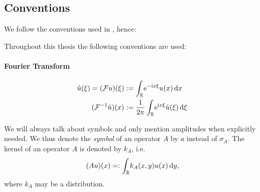 \subsection{Conventions}
We follow the conventions used in \cite{Les:PDO}, hence:

Throughout this thesis the following conventions are used:
\paragraph{Fourier Transform}
\begin{align*}
  \hat{u}(\xi) = (\mathcal{F}u)(\xi)
    &:= \Integ{\mathbb{R}}{x}{\Eto{-\mathrm ix\xi} u(x)} \\
  (\mathcal{F}^{-1}\hat{u})(x) &:=
  \frac{1}{2\pi}\Integ{\mathbb{R}}{\xi}{\Eto{\mathrm ix\xi}
    \hat{u}(\xi)}
\end{align*}

We will always talk about symbols and only mention amplitudes when explicitly
needed. We thus denote the \emph{symbol} of an operator $A$ by $a$ instead of
$\sigma_A$. The kernel of an operator $A$ is denoted by $k_A$, i.e.\ 
\begin{align*}
  (Au)(x) =: \Integ{\mathbb{R}}{y}{k_A(x,y) u(x)},
\end{align*}
where $k_A$ may be a distribution.

